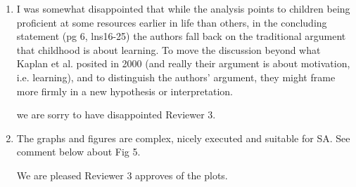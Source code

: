 \documentclass{article}
\newcommand{\rev}[1]{{\color{ForestGreen}#1}}
\begin{document}
\begin{enumerate}
    \item I was somewhat disappointed that while the analysis points to children being proficient at some resources earlier in life than others, in the concluding statement (pg 6, lns16-25) the authors fall back on the traditional argument that childhood is about learning. To move the discussion beyond what Kaplan et al. posited in 2000 (and really their argument is about motivation, i.e. learning), and to distinguish the authors’ argument, they might frame more firmly in a new hypothesis or interpretation.
    
    \rev{we are sorry to have disappointed Reviewer 3.} %
    
    \item The graphs and figures are complex, nicely executed and suitable for SA. See comment below about Fig 5. 
    
    \rev{We are pleased Reviewer 3 approves of the plots.}
\end{enumerate}
    
\end{document}
